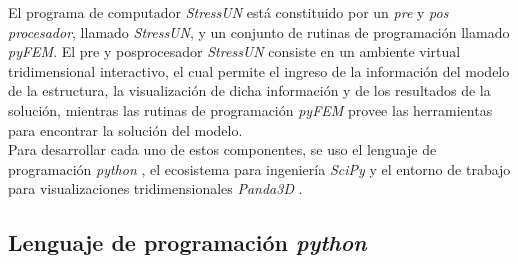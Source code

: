 El programa de computador \textit{StressUN} está constituido por un \textit{pre} y \textit{pos procesador}, llamado \textit{StressUN}, y un conjunto de rutinas de programación llamado \textit{pyFEM}. El pre y posprocesador \textit{StressUN} consiste en un ambiente virtual tridimensional interactivo, el cual permite el ingreso de la información del modelo de la estructura, la visualización de dicha información y de los resultados de la solución, mientras las rutinas de programación \textit{pyFEM} provee las herramientas para encontrar la solución del modelo. \\

Para desarrollar cada uno de estos componentes, se uso el lenguaje de programación \textit{python} \cite{Rossum}, el ecosistema para ingeniería \textit{SciPy} \cite{Enthought} y el entorno de trabajo para visualizaciones tridimensionales \textit{Panda3D} \cite{TheWaltDisneyCompany}. \\

\subsection{Lenguaje de programación \textit{python}}

